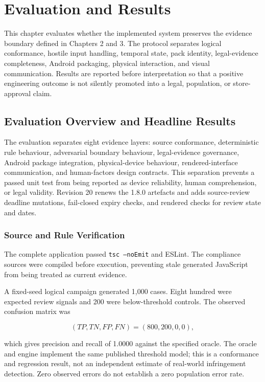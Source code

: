 \section{Evaluation and Results}

This chapter evaluates whether the implemented system preserves the evidence boundary defined in Chapters 2 and 3. The protocol separates logical conformance, hostile input handling, temporal state, pack identity, legal-evidence completeness, Android packaging, physical interaction, and visual communication. Results are reported before interpretation so that a positive engineering outcome is not silently promoted into a legal, population, or store-approval claim.

\subsection{Evaluation Overview and Headline Results}

The evaluation separates eight evidence layers: source conformance, deterministic rule behaviour, adversarial boundary behaviour, legal-evidence governance, Android package integration, physical-device behaviour, rendered-interface communication, and human-factors design contracts. This separation prevents a passed unit test from being reported as device reliability, human comprehension, or legal validity. Revision 20 renews the 1.8.0 artefacts and adds source-review deadline mutations, fail-closed expiry checks, and rendered checks for review state and dates.

\subsubsection{Source and Rule Verification}

The complete application passed \texttt{tsc --noEmit} and ESLint. The compliance sources were compiled before execution, preventing stale generated JavaScript from being treated as current evidence.

A fixed-seed logical campaign generated 1,000 cases. Eight hundred were expected review signals and 200 were below-threshold controls. The observed confusion matrix was

\begin{equation}
(TP,TN,FP,FN)=(800,200,0,0),
\end{equation}

which gives precision and recall of 1.0000 against the specified oracle. The oracle and engine implement the same published threshold model; this is a conformance and regression result, not an independent estimate of real-world infringement detection. Zero observed errors do not establish a zero population error rate.

